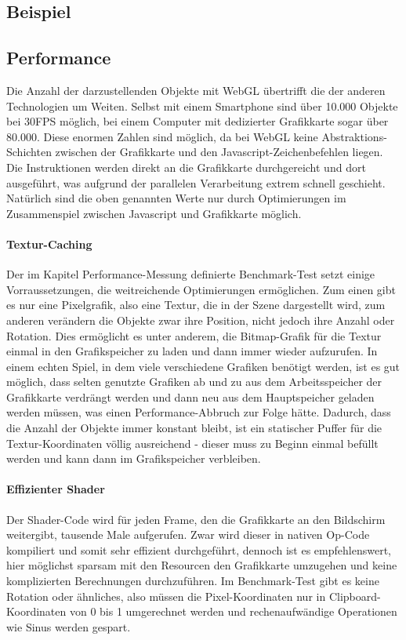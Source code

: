 \documentclass[a4paper, 12pt]{article}
\begin{document}
\subsection{Beispiel}
\subsection{Performance}
Die Anzahl der darzustellenden Objekte mit WebGL übertrifft die der anderen Technologien um Weiten. Selbst mit einem Smartphone sind über 10.000 Objekte bei 30FPS möglich, bei einem Computer mit dedizierter Grafikkarte sogar über 80.000. Diese enormen Zahlen sind möglich, da bei WebGL keine Abstraktions-Schichten zwischen der Grafikkarte und den Javascript-Zeichenbefehlen liegen. Die Instruktionen werden direkt an die Grafikkarte durchgereicht und dort ausgeführt, was aufgrund der parallelen Verarbeitung extrem schnell geschieht. Natürlich sind die oben genannten Werte nur durch Optimierungen im Zusammenspiel zwischen Javascript und Grafikkarte möglich.
\paragraph{Textur-Caching} Der im Kapitel Performance-Messung definierte Benchmark-Test setzt einige Vorraussetzungen, die weitreichende Optimierungen ermöglichen. Zum einen gibt es nur eine Pixelgrafik, also eine Textur, die in der Szene dargestellt wird, zum anderen verändern die Objekte zwar ihre Position, nicht jedoch ihre Anzahl oder Rotation. Dies ermöglicht es unter anderem, die Bitmap-Grafik für die Textur einmal in den Grafikspeicher zu laden und dann immer wieder aufzurufen. In einem echten Spiel, in dem viele verschiedene Grafiken benötigt werden, ist es gut möglich, dass selten genutzte Grafiken ab und zu aus dem Arbeitsspeicher der Grafikkarte verdrängt werden und dann neu aus dem Hauptspeicher geladen werden müssen, was einen Performance-Abbruch zur Folge hätte.
Dadurch, dass die Anzahl der Objekte immer konstant bleibt, ist ein statischer Puffer für die Textur-Koordinaten völlig ausreichend - dieser muss zu Beginn einmal befüllt werden und kann dann im Grafikspeicher verbleiben.
\paragraph{Effizienter Shader} Der Shader-Code wird für jeden Frame, den die Grafikkarte an den Bildschirm weitergibt, tausende Male aufgerufen. Zwar wird dieser in nativen Op-Code kompiliert und somit sehr effizient durchgeführt, dennoch ist es empfehlenswert, hier möglichst sparsam mit den Resourcen den Grafikkarte umzugehen und keine komplizierten Berechnungen durchzuführen. Im Benchmark-Test gibt es keine Rotation oder ähnliches, also müssen die Pixel-Koordinaten nur in Clipboard-Koordinaten von 0 bis 1 umgerechnet werden und rechenaufwändige Operationen wie Sinus werden gespart.
\end{document}
